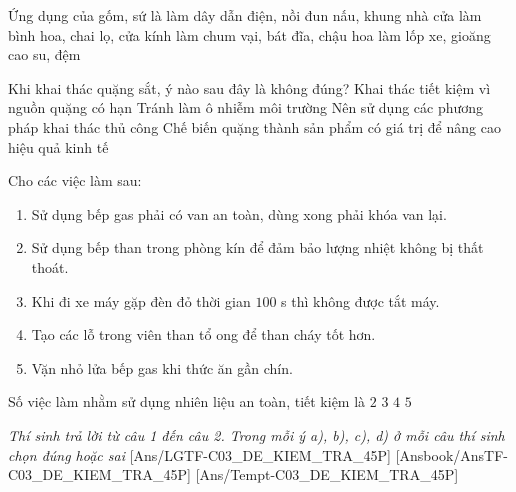 \documentclass[Main.tex]{subfiles}
\begin{document}
\begin{ex}%
	Ứng dụng của gốm, sứ là
	\choice
	{làm dây dẫn điện, nồi đun nấu, khung nhà cửa}
	{làm bình hoa, chai lọ, cửa kính}
	{\True làm chum vại, bát đĩa, chậu hoa}
	{làm lốp xe, gioăng cao su, đệm}
\end{ex}

\begin{ex}%
	Khi khai thác quặng sắt, ý nào sau đây là không đúng?
	\choice
	{Khai thác tiết kiệm vì nguồn quặng có hạn}
	{Tránh làm ô nhiễm môi trường}
	{\True Nên sử dụng các phương pháp khai thác thủ công}
	{Chế biến quặng thành sản phẩm có giá trị để nâng cao hiệu quả kinh tế}
\end{ex}

\begin{ex}%
	Cho các việc làm sau:
	\begin{enumerate}
		\item[(a)] Sử dụng bếp gas phải có van an toàn, dùng xong phải khóa van lại.
		\item[(b)] Sử dụng bếp than trong phòng kín để đảm bảo lượng nhiệt không bị thất thoát.
		\item[(c)] Khi đi xe máy gặp đèn đỏ thời gian $100$ s thì không được tắt máy.
		\item[(d)] Tạo các lỗ trong viên than tổ ong để than cháy tốt hơn.
		\item[(e)] Vặn nhỏ lửa bếp gas khi thức ăn gần chín.
	\end{enumerate}
	Số việc làm nhằm sử dụng nhiên liệu an toàn, tiết kiệm là
	\choice
	{$2$}
	{\True $3$}
	{$4$}
	{$5$}
\end{ex}

\textit{\large Thí sinh trả lời từ câu 1 đến câu 2. Trong mỗi ý a), b), c), d) ở mỗi câu thí sinh chọn đúng hoặc sai}
[Ans/LGTF-C03_DE_KIEM_TRA_45P]
[Ansbook/AnsTF-C03_DE_KIEM_TRA_45P]
[Ans/Tempt-C03_DE_KIEM_TRA_45P]
\setcounter{ex}{0}
\end{document}
